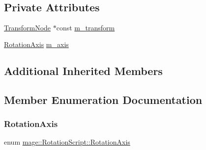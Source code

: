 \subsection*{Private Attributes}
\begin{DoxyCompactItemize}
\item 
\hyperlink{structmage_1_1_transform_node}{Transform\+Node} $\ast$const \hyperlink{classmage_1_1_rotation_script_a9dd84c2b928dece60bc1d72a16b20030}{m\+\_\+transform}
\item 
\hyperlink{classmage_1_1_rotation_script_ad06cf896ce6dfe4f6676b263d15b4ee9}{Rotation\+Axis} \hyperlink{classmage_1_1_rotation_script_a8fb1d0fb6e3dac1dd91f2d16e1954f21}{m\+\_\+axis}
\end{DoxyCompactItemize}
\subsection*{Additional Inherited Members}


\subsection{Member Enumeration Documentation}
\hypertarget{classmage_1_1_rotation_script_ad06cf896ce6dfe4f6676b263d15b4ee9}{}\label{classmage_1_1_rotation_script_ad06cf896ce6dfe4f6676b263d15b4ee9} 
\subsubsection{\texorpdfstring{Rotation\+Axis}{RotationAxis}}
{\footnotesize\ttfamily enum \hyperlink{classmage_1_1_rotation_script_ad06cf896ce6dfe4f6676b263d15b4ee9}{mage\+::\+Rotation\+Script\+::\+Rotation\+Axis}\hspace{0.3cm}{\ttfamily [strong]}}

